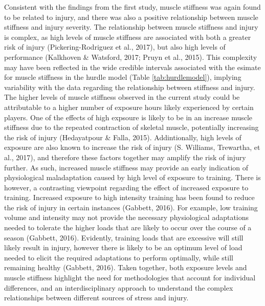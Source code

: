 \documentclass[man,floatsintext]{apa6}
\begin{document}
Consistent with the findings from the first study, muscle stiffness was again found to be related to injury, and there was also a positive relationship between muscle stiffness and injury severity.
The relationship between muscle stiffness and injury is complex, as high levels of muscle stiffness are associated with both a greater risk of injury (Pickering-Rodriguez et al., 2017), but also high levels of performance (Kalkhoven \& Watsford, 2017; Pruyn et al., 2015).
This complexity may have been reflected in the wide credible intervals associated with the esimate for muscle stiffness in the hurdle model (Table \ref{tab:hurdlemodel}), implying variability with the data regarding the relationship between stiffness and injury.
The higher levels of muscle stiffness observed in the current study could be attributable to a higher number of exposure hours likely experienced by certain players.
One of the effects of high expsoure is likely to be in an increase muscle stiffness due to the repeated contraction of skeletal muscle, potentially increasing the risk of injury (Hedayatpour \& Falla, 2015).
Addintionally, high levels of exposure are also known to increase the risk of injury (S. Williams, Trewartha, et al., 2017), and therefore these factors together may amplify the risk of injury further.
As such, increased muscle stiffness may provide an early indication of physiological maladaptation caused by high level of exposure to training.
There is however, a contrasting viewpoint regarding the effect of increased exposure to training.
Increased exposure to high intensity training has been found to reduce the risk of injury in certain instances (Gabbett, 2016).
For example, low training volume and intensity may not provide the necessary physiological adaptations needed to tolerate the higher loads that are likely to occur over the course of a season (Gabbett, 2016).
Evidently, training loads that are excessive will still likely result in injury, however there is likely to be an optimum level of load needed to elicit the required adaptations to perform optimally, while still remaining healthy (Gabbett, 2016).
Taken together, both exposure levels and muscle stiffness highlight the need for methodologies that account for individual differences, and an interdisciplinary approach to understand the complex relationships between different sources of stress and injury.
\end{document}
